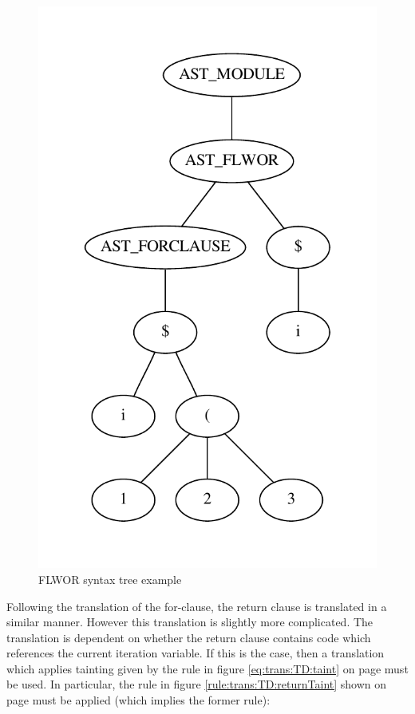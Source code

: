 \begin{figure}[!htp]
\begin{center}
  \includegraphics[scale=0.4]{img/graphs/flwor2}
  \caption{FLWOR syntax tree example}
  \label{fig:impl:td:flwor2}
\end{center}
\end{figure}

Following the translation of the for-clause, the return clause is translated in
a similar manner. However this translation is slightly more complicated. The
translation is dependent on whether the return clause contains code which
references the current iteration variable. If this is the case, then a
translation which applies tainting given by the rule in figure
\ref{eq:trans:TD:taint} on page \pageref{eq:trans:TD:taint} must be used. In
particular, the rule in figure \ref{rule:trans:TD:returnTaint} shown on page
\pageref{rule:trans:TD:returnTaint} must be applied (which implies the former
rule):

